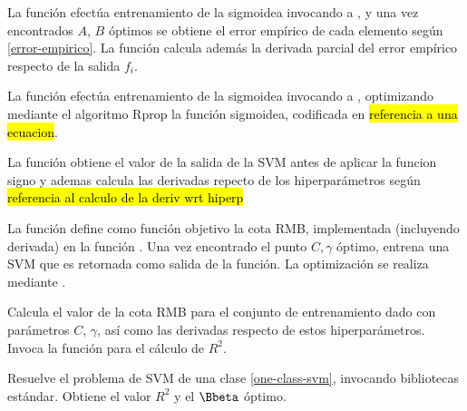 La función  efectúa entrenamiento de la
sigmoidea invocando a , y una vez
encontrados $A$, $B$ óptimos se obtiene el error empírico de cada
elemento según {\ref{error-empirico}}.
La función calcula además la derivada parcial del error empírico
respecto de la salida $f_i$.

La función  efectúa entrenamiento de la
sigmoidea invocando a , optimizando
mediante el algoritmo Rprop la función sigmoidea, codificada en
 \hl{referencia a una ecuacion}.

La función  obtiene el valor de la salida de la SVM
antes de aplicar la funcion signo y ademas calcula las derivadas
repecto de los hiperparámetros según \hl{referencia al calculo de la
  deriv wrt hiperp}

La función  define como función objetivo la
cota RMB, implementada (incluyendo derivada) en la función
. Una vez encontrado el punto $C,\gamma$
óptimo, entrena una SVM que es retornada como salida de la función.
La optimización se realiza mediante .

Calcula el valor de la cota RMB para el conjunto de entrenamiento dado
con parámetros $C$, $\gamma$, así como las derivadas respecto de estos
hiperparámetros.  Invoca la función  para el
cálculo de $R^2$.

Resuelve el problema de SVM de una clase {\ref{one-class-svm}},
invocando bibliotecas estándar.  Obtiene el valor $R^2$ y el $\Bbeta$
óptimo.